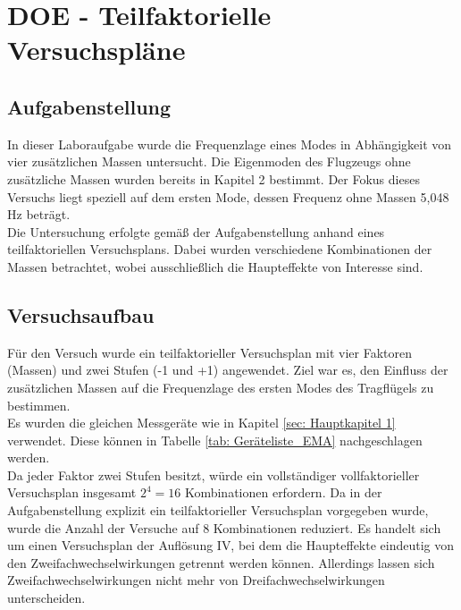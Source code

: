 \chapter{DOE - Teilfaktorielle Versuchspläne}
\label{sec: Hauptkapitel 4}

\section{Aufgabenstellung}
    In dieser Laboraufgabe wurde die Frequenzlage eines Modes in Abhängigkeit von vier 
    zusätzlichen Massen untersucht. Die Eigenmoden des Flugzeugs ohne zusätzliche Massen 
    wurden bereits in Kapitel 2 bestimmt. Der Fokus dieses Versuchs liegt speziell auf dem 
    ersten Mode, dessen Frequenz ohne Massen 5,048 Hz beträgt.  
    \\

    \noindent
    Die Untersuchung erfolgte gemäß der Aufgabenstellung anhand eines teilfaktoriellen 
    Versuchsplans. Dabei wurden verschiedene Kombinationen der Massen betrachtet, wobei 
    ausschließlich die Haupteffekte von Interesse sind.


\section{Versuchsaufbau}
    Für den Versuch wurde ein teilfaktorieller Versuchsplan mit vier Faktoren (Massen) 
    und zwei Stufen (-1 und +1) angewendet. Ziel war es, den Einfluss der zusätzlichen Massen 
    auf die Frequenzlage des ersten Modes des Tragflügels zu bestimmen.  
    \\

    \noindent
    Es wurden die gleichen Messgeräte wie in Kapitel \ref{sec: Hauptkapitel 1}
    verwendet. Diese können in Tabelle \ref{tab: Geräteliste_EMA} nachgeschlagen
    werden.
    \\

    \noindent
    Da jeder Faktor zwei Stufen besitzt, würde ein vollständiger vollfaktorieller Versuchsplan 
    insgesamt \(2^4 = 16\) Kombinationen erfordern. Da in der Aufgabenstellung explizit ein 
    teilfaktorieller Versuchsplan vorgegeben wurde, wurde die Anzahl der Versuche auf 
    8 Kombinationen reduziert. Es handelt sich um einen Versuchsplan der Auflösung IV, 
    bei dem die Haupteffekte eindeutig von den Zweifachwechselwirkungen getrennt werden können. 
    Allerdings lassen sich Zweifachwechselwirkungen nicht mehr von Dreifachwechselwirkungen unterscheiden.
    \\

